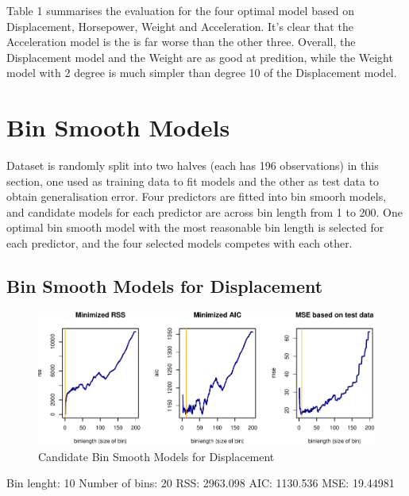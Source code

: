 \documentclass[]{article}
\begin{document}
Table 1 summarises the evaluation for the four optimal model based on
Displacement, Horsepower, Weight and Acceleration. It's clear that the
Acceleration model is the is far worse than the other three. Overall,
the Displacement model and the Weight are as good at predition, while
the Weight model with 2 degree is much simpler than degree 10 of the
Displacement model.

\hypertarget{bin-smooth-models}{%
\section{Bin Smooth Models}\label{bin-smooth-models}}

Dataset is randomly split into two halves (each has 196 observations) in
this section, one used as training data to fit models and the other as
test data to obtain generalisation error. Four predictors are fitted
into bin smoorh models, and candidate models for each predictor are
across bin length from 1 to 200. One optimal bin smooth model with the
most reasonable bin length is selected for each predictor, and the four
selected models competes with each other.

\hypertarget{bin-smooth-models-for-displacement}{%
\subsection{Bin Smooth Models for
Displacement}\label{bin-smooth-models-for-displacement}}

\begin{figure}

{\centering \includegraphics{Report_files/figure-latex/bin-d-1} 

}

\caption{Candidate Bin Smooth Models for Displacement}\label{fig:bin-d}
\end{figure}

Bin lenght: 10 Number of bins: 20 RSS: 2963.098 AIC: 1130.536 MSE:
19.44981
\end{document}
